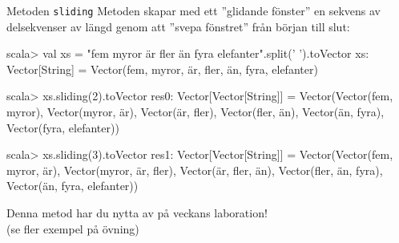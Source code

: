 \begin{Slide}{Metoden \texttt{sliding}}\SlideFontSmall
Metoden  skapar med ett ''glidande fönster'' en sekvens av
delsekvenser av längd  genom att ''svepa fönstret'' från början till slut:
\begin{REPL}
scala> val xs = "fem myror är fler än fyra elefanter".split(' ').toVector
xs: Vector[String] = Vector(fem, myror, är, fler, än, fyra, elefanter)

scala> xs.sliding(2).toVector
res0: Vector[Vector[String]] =
  Vector(Vector(fem, myror), Vector(myror, är), Vector(är, fler),
     Vector(fler, än), Vector(än, fyra), Vector(fyra, elefanter))

scala> xs.sliding(3).toVector
res1: Vector[Vector[String]] =
  Vector(Vector(fem, myror, är), Vector(myror, är, fler),
    Vector(är, fler, än), Vector(fler, än, fyra),
      Vector(än, fyra, elefanter))
\end{REPL}
Denna metod har du nytta av på veckans laboration!
\\(se fler exempel på övning)
\end{Slide}
